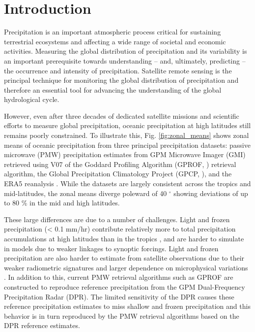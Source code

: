 \documentclass{ametsocV6.1}
\begin{document}
\section{Introduction}

Precipitation is an important atmospheric process critical for sustaining
terrestrial ecosystems and affecting a wide range of societal and economic
activities. Measuring the global distribution of precipitation and its
variability is an important prerequisite towards understanding – and,
ultimately, predicting – the occurrence and intensity of precipitation.
Satellite remote sensing is the principal technique for monitoring the global
distribution of precipitation and therefore an essential tool for advancing the
understanding of the global hydrological cycle.

However, even after three decades of dedicated satellite missions and scientific
efforts to measure global precipitation, oceanic precipitation at high latitudes still
remains poorly constrained. To illustrate this, Fig. \ref{fig:zonal_means} shows zonal means of
oceanic precipitation from three principal precipitation datasets: passive microwave (PMW)
precipitation estimates from GPM Microwave Imager (GMI) retrieved using  V07
of the Goddard Profiling Algorithm (GPROF, \citet{kummerow_evolution_2015}) retrieval algorithm, the Global
Precipitation Climatology Project (GPCP, \citet{huffman_new_2023}), and the ERA5
reanalysis \citep{hersbach_era5_2020}. While the datasets are largely consistent
across the tropics and mid-latitudes, the zonal means diverge poleward of 40 $^\circ$
showing deviations of up to 80 \% in the mid and high latitudes.

These large differences are due to a number of challenges. Light and frozen
precipitation (< 0.1 mm/hr) contribute relatively more to total precipitation
accumulations at high latitudes than in the tropics \citep{milani_state_2023},
and are harder to simulate in models due to weaker linkages to synoptic
forcings. Light and frozen precipitation are also harder to estimate from
satellite observations due to their weaker radiometric signatures
\citep{kidd_global_2011} and larger dependence on microphysical variations
\citep{ekelund_2020}. In addition to this, current PMW retrieval algorithms such
as GPROF are constructed to reproduce reference precipitation from the GPM
Dual-Frequency Precipitation Radar (DPR). The limited sensitivity of the DPR
causes these reference precipitation estimates to miss shallow and frozen
precipitation and this behavior is in turn reproduced by the PMW retrieval
algorithms based on the DPR reference estimates.
\end{document}
